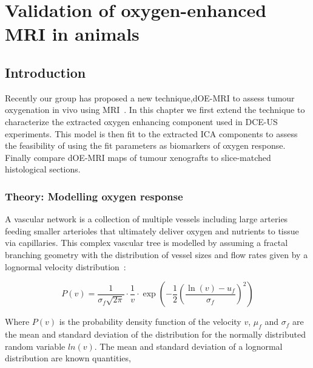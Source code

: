 
\chapter{Validation of oxygen-enhanced MRI in animals}
\label{ch:oemri2}

\section{Introduction}

Recently our group has proposed a new technique,\acs{dOE-MRI} to assess tumour oxygenation in vivo using MRI~\cite{Moosvi:2018ca}.
In this chapter we first extend the technique to characterize the extracted oxygen enhancing component used in \acs{DCE-US} experiments.
This model is then fit to the extracted \acs{ICA} components to assess the feasibility of using the fit parameters as biomarkers of oxygen response.
Finally compare \acs{dOE-MRI} maps of tumour xenografts to slice-matched histological sections.

\subsection{Theory: Modelling oxygen response}
\label{sec:lognormalfitting_theory}
A vascular network is a collection of multiple vessels including large arteries feeding smaller arterioles that ultimately deliver oxygen and nutrients to tissue via capillaries.
This complex vascular tree is modelled by assuming a fractal branching geometry with the distribution of vessel sizes and flow rates given by a lognormal velocity distribution~\cite{Qian:2000ca}:

\begin{equation}
P(v)=\frac{1}{\sigma_{f} \sqrt{2 \pi}} \cdot \frac{1}{v} \cdot \exp \left(-\frac{1}{2}\left(\frac{\ln (v)-u_{f}}{\sigma_{f}}\right)^{2}\right)
\end{equation}

Where $P(v)$ is the probability density function of the velocity $v$, $\mu_f$ and $\sigma_f$ are the mean and standard deviation of the distribution for the normally distributed random variable $ln(v)$.
The mean and standard deviation of a lognormal distribution are known quantities,

